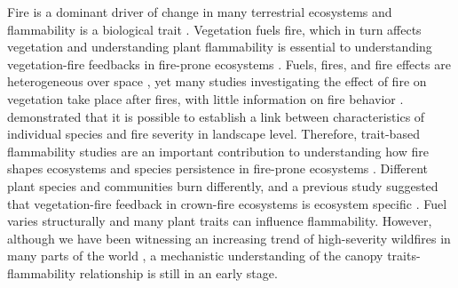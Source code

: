 \documentclass{ttuthes2007}
\begin{document}
Fire is a dominant driver of change in many terrestrial ecosystems and flammability is a biological trait \citep{pausasandmoi2012flammability}. Vegetation fuels fire, which in turn affects vegetation \citep{bova2005linking, jones2006prediction, kavanagh2010way,o2010acute, michaletz2012moving, west2016experimental, lodge2018xylem, bar2019fire}
and understanding plant flammability is essential to understanding vegetation-fire feedbacks in fire-prone ecosystems \citep{pausas2012fire, pausas2017flammability}. Fuels, fires, and fire effects are heterogeneous over space \citep{gagnon2010does}, yet many studies investigating the effect of fire on vegetation take place after fires, with little information on fire behavior \citep{o2018advances}. \citet{schwilk2011scaling} demonstrated that it is possible to establish a link between characteristics of individual species  and fire severity in landscape level. Therefore, trait-based flammability studies are an important contribution to understanding how fire shapes ecosystems and species persistence in fire-prone ecosystems \citep{pausas2012fire, pausas2017flammability}. Different plant species and communities burn differently, and a previous study suggested that vegetation-fire feedback in crown-fire ecosystems is ecosystem specific \citep{pausas2004plant}. Fuel varies structurally and many plant traits can influence flammability. %
However, although we have been witnessing an increasing trend of high-severity wildfires in many parts of the world \citep{miller2012trends, dennison2014large, weber2020spatiotemporal, salguero2020wildfire}, a mechanistic understanding of the canopy traits-flammability relationship is still in an early stage.
\end{document}
